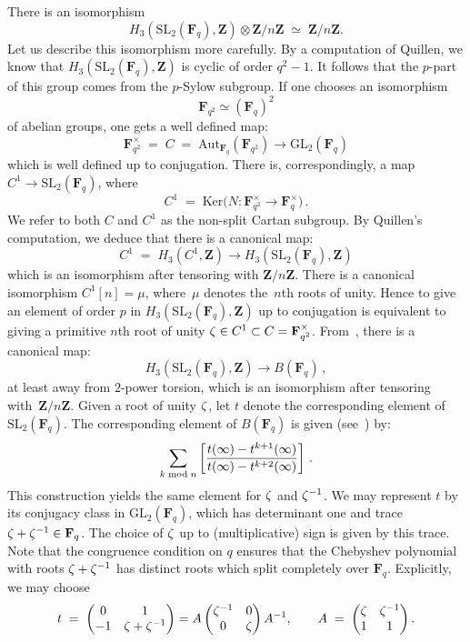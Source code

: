 \documentclass[12pt,reqno]{amsart}
\theoremstyle{definition}
\def\={\;=\;}
\def\mod{\;\text{\rm mod}\;}
\def\Z{\mathbf Z}   %
\def\F{\mathbf F}   %
\def\SL{\mathrm{SL}}
\def\nn{n}
\def\SL{\mathrm{SL}}
\def\GL{\mathrm{GL}}
\def\Aut{\mathrm{Aut}}
\begin{document}
There is an isomorphism
$$
H_3(\SL_2(\F_q),\Z) \otimes \Z/\nn\Z \; \simeq\; \Z/\nn\Z.
$$
Let us describe this isomorphism more carefully. By a computation of 
Quillen, we know that $H_3(\SL_2(\F_q),\Z)$ is cyclic of order $q^2 - 1$. 
It follows that the $p$-part of this group comes from the 
$p$-Sylow subgroup. If one chooses an isomorphism
$$
\F_{q^2} \simeq (\F_q)^2
$$
of abelian groups, one gets a well defined map:
$$
\F^{\times}_{q^2} \= C \= \Aut_{\F_q}(\F_{q^2}) \rightarrow \GL_2(\F_q)
$$
which is well defined up to conjugation.
There is, correspondingly, a map $C^1 \rightarrow \SL_2(\F_q)$, where
$$
C^1 \= \text{Ker}\bigl(N: \F^{\times}_{q^2} \rightarrow \F^{\times}_q \bigr)\,.
$$
We refer to both $C$ and $C^1$ as the non-split Cartan subgroup. 
By Quillen's computation, we deduce that there is a canonical map:
$$
C^1 \= H_3(C^1,\Z) \rightarrow H_3(\SL_2(\F_q),\Z)
$$
which is an isomorphism after tensoring with $\Z/\nn \Z$.
There is a canonical isomorphism $C^1[\nn] = \mu$, where~$\mu$ denotes 
the~$\nn$th roots of unity. Hence to give an element of order $p$
in $H_3(\SL_2(\F_q),\Z)$ up to conjugation is equivalent to giving a primitive
$\nn$th root of unity $\z  \in C^1 \subset C = \F^{\times}_{q^2}$. 
From~\cite{Hutch}, there is a canonical map:
$$
H_3(\SL_2(\F_q),\Z) \rightarrow B(\F_q)\,,
$$
at least away from $2$-power torsion,
which is an isomorphism after tensoring with~$\Z/\nn \Z$. Given a root of 
unity $\zeta$, let $t$ denote the corresponding element of $\SL_2(\F_q)$. 
The corresponding element of $B(\F_q)$ is given 
(see~\cite{Hutch}) by:
$$
\sum_{k \mod \nn} \left[ \frac{t(\infty) - t^{k+1}(\infty)}{
t(\infty) - t^{k+2}(\infty)} \right]\,.
$$
This construction yields the same element for $\zeta$ and $\zeta^{-1}$.
We may represent $t$ by its conjugacy class in $\GL_2(\F_q)$, which has
determinant one and trace $\z + \z^{-1} \in \F_q$. The choice of 
$\zeta$ up
to (multiplicative) sign is given by this trace. Note that the congruence 
condition on $q$ ensures
that the Chebyshev polynomial with roots $\zeta + \zeta^{-1}$ has distinct 
roots which
split completely over $\F_q$. Explicitly, we may choose
$$ 
t \= 
\left(\begin{matrix} 0 & 1 \\ -1 & \z + \z^{-1} \end{matrix} \right) = 
A \left(\begin{matrix} \z^{-1} & 0  \\ 0 & \z \end{matrix} \right) A^{-1},
\qquad 
A  \= \left(\begin{matrix} \z & \z^{-1} \\ 1 & 1 \end{matrix} \right).
$$
\end{document}
